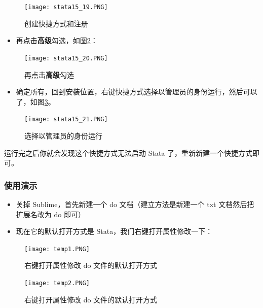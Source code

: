 \documentclass[cn,fancy,blue,11pt]{elegantbook}
\begin{document}
\begin{figure}[htbp]
  \centering
  \texttt{[image: stata15\_19.PNG]}
  \caption{创建快捷方式和注册}
  \label{fig:stata15_19}
\end{figure}

\begin{itemize}
\item
  再点击\textbf{高级}勾选，如图\ref{fig:stata15_20}：
\end{itemize}

\begin{figure}[htbp]
  \centering
  \texttt{[image: stata15\_20.PNG]}
  \caption{再点击\textbf{高级}勾选}
  \label{fig:stata15_20}
\end{figure}

\begin{itemize}
\item
  确定所有，回到安装位置，右键快捷方式选择以管理员的身份运行，然后可以了，如图\ref{fig:stata15_21}。
\end{itemize}

\begin{figure}[htbp]
  \centering
  \texttt{[image: stata15\_21.PNG]}
  \caption{选择以管理员的身份运行}
  \label{fig:stata15_21}
\end{figure}

运行完之后你就会发现这个快捷方式无法启动 Stata 了，重新新建一个快捷方式即可。

\hypertarget{section-9}{%
\subsubsection{使用演示}\label{section-9}}

\begin{itemize}
\item
  关掉 Sublime，首先新建一个 do 文档（建立方法是新建一个 txt 文档然后把扩展名改为 do 即可）
\item
  现在它的默认打开方式是 Stata，我们右键打开属性修改一下：
\end{itemize}

\begin{figure}[htbp]
  \centering
  \texttt{[image: temp1.PNG]}
  \caption{右键打开属性修改 do 文件的默认打开方式}
  \label{fig:temp1}
\end{figure}

\begin{figure}[htbp]
  \centering
  \texttt{[image: temp2.PNG]}
  \caption{右键打开属性修改 do 文件的默认打开方式}
  \label{fig:temp2}
\end{figure}
\end{document}
